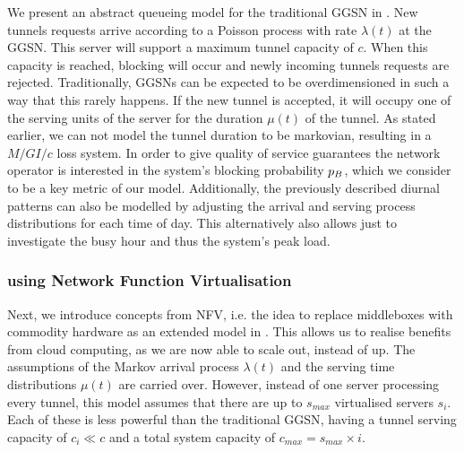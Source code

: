 We present an abstract queueing model for the traditional \gls{GGSN} in .
New tunnels requests arrive according to a Poisson process with rate \(\lambda(t)\) at the \gls{GGSN}.
This server will support a maximum tunnel capacity of \(c\).
When this capacity is reached, blocking will occur and newly incoming tunnels requests are rejected.
Traditionally, \glspl{GGSN} can be expected to be overdimensioned in such a way that this rarely happens.
If the new tunnel is accepted, it will occupy one of the serving units of the server for the duration \(\mu(t)\) of the tunnel.
As stated earlier, we can not model the tunnel duration to be markovian, resulting in a  \(M/GI/c\) loss system.
In order to give quality of service guarantees the network operator is interested in the system's blocking probability \(p_B\), which we consider to be a key metric of our model.
Additionally, the previously described diurnal patterns can also be modelled by adjusting the arrival and serving process distributions for each time of day.
This alternatively also allows just to investigate the busy hour and thus the system's peak load.

\subsubsection*{ using Network Function Virtualisation}\label{sec:cloud:virtualized_network_functions:model:virtual_ggsn}
Next, we introduce concepts from \gls{NFV}, i.e. the idea to replace middleboxes with commodity hardware as an extended model in .
This allows us to realise benefits from cloud computing, as we are now able to scale out, instead of up.
The assumptions of the Markov arrival process \(\lambda(t)\) and the serving time distributions \(\mu(t)\) are carried over.
However, instead of one server processing every tunnel, this model assumes that there are up to \(s_{max}\) virtualised servers \(s_i\).
Each of these is less powerful than the traditional \gls{GGSN}, having a tunnel serving capacity of \(c_i \ll c\) and a total system capacity of \(c_{max} = s_{max} \times i\).

